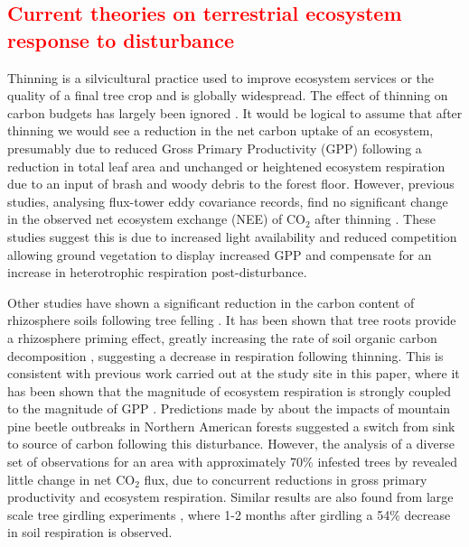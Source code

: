 \documentclass[draft,linenumbers]{agujournal}
\begin{document}
\subsection{\textcolor{red}{Current theories on terrestrial ecosystem response to disturbance}}
Thinning is a silvicultural practice used to improve ecosystem services or the quality of a final tree crop and is globally widespread. The effect of thinning on carbon budgets has largely been ignored \citep{JGRG:JGRG779}. It would be logical to assume that after thinning we would see a reduction in the net carbon uptake of an ecosystem, presumably due to reduced Gross Primary Productivity (GPP) following a reduction in total leaf area and unchanged or heightened ecosystem respiration due to an input of brash and woody debris to the forest floor. However, previous studies, analysing flux-tower eddy covariance records, find no significant change in the observed net ecosystem exchange (NEE) of CO\(_{2}\) after thinning \citep{vesala2005effect, wilkinson2015effects, moreaux2011paired, dore2012recovery}. These studies suggest this is due to increased light availability and reduced competition allowing ground vegetation to display increased GPP and compensate for an increase in heterotrophic respiration post-disturbance.  

Other studies have shown a significant reduction in the carbon content of rhizosphere soils following tree felling \citep{Hernesmaa2005777}. It has been shown that tree roots provide a rhizosphere priming effect, greatly increasing the rate of soil organic carbon decomposition \citep{ELE:ELE1095}, suggesting a decrease in respiration following thinning. This is consistent with previous work carried out at the study site in this paper, where it has been shown that the magnitude of ecosystem respiration is strongly coupled to the magnitude of GPP \citep{heinemeyer2012exploring}. Predictions made by \citet{kurz2008mountain} about the impacts of mountain pine beetle outbreaks in Northern American forests suggested a switch from sink to source of carbon following this disturbance. However, the analysis of a diverse set of observations for an area with approximately 70\% infested trees by \citet{ELE:ELE12097} revealed little change in net CO\(_{2}\) flux, due to concurrent reductions in gross primary productivity and ecosystem respiration. Similar results are also found from large scale tree girdling experiments \citep{hogberg2001large},  where 1-2 months after girdling a 54\% decrease in soil respiration is observed.
\end{document}
